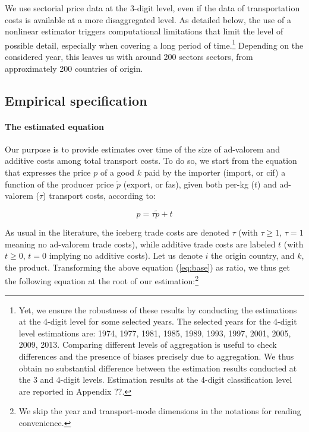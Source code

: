 \documentclass[a4paper,11pt]{article}
\begin{document}
We use sectorial price data at the 3-digit level, even if the data of transportation costs is available at a more disaggregated level. As detailed below, the use of a nonlinear estimator triggers computational limitations that limit the level of possible detail, especially when covering a long period of time.\footnote{Yet, we ensure the robustness of these results by conducting the estimations at the 4-digit level for some selected years. The selected years for the 4-digit level estimations are: 1974, 1977, 1981, 1985, 1989, 1993, 1997, 2001, 2005, 2009, 2013. Comparing different levels of aggregation is useful to check differences and the presence of biases precisely due to aggregation. We thus obtain no substantial difference between the estimation results conducted at the 3 and 4-digit levels. Estimation results at the 4-digit classification level are reported in Appendix ??.} Depending on the considered year, this leaves us with around 200 sectors sectors, from approximately 200 countries of origin.


\subsection{Empirical specification}

\paragraph{The estimated equation} Our purpose is to provide estimates over time of the size of ad-valorem and additive costs among total transport costs. To do so, we start from the equation that expresses the price $p$ of a good $k$ paid by the importer (import, or cif) a function of the producer price $\widetilde{p}$ (export, or fas), given both per-kg ($t$) and ad-valorem ($\tau$) transport costs, according to:

\begin{equation}
p = \tau \widetilde{p}+ t \label{eq:base}
\end{equation}

\noindent As usual in the literature, the iceberg trade costs are denoted $\tau$ (with  $\tau \geq 1$, $\tau=1$ meaning no ad-valorem trade costs), while additive trade costs are labeled $t$ (with $t \geq 0$, $t=0$ implying no additive costs).  Let us denote $i$ the origin country, and $k$, the product. Transforming the above equation (\ref{eq:base}) as ratio, we thus get the following equation at the root of our estimation:\footnote{We skip the year and transport-mode dimensions in the notations for reading convenience.}
\end{document}
